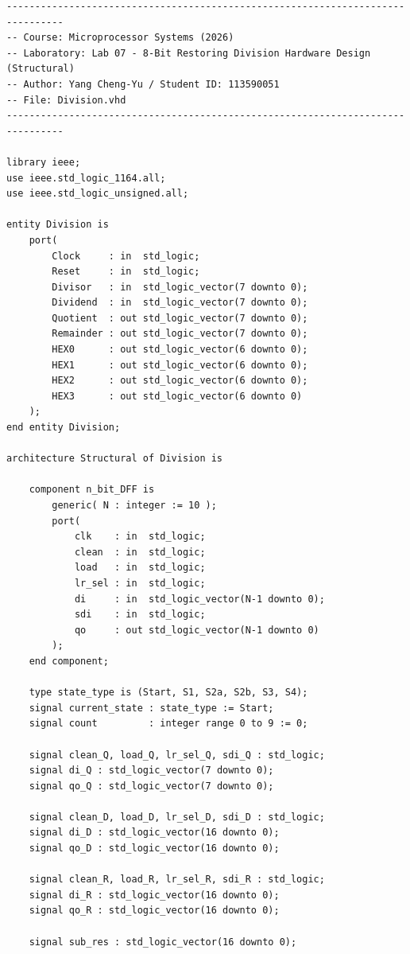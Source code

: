 \documentclass[12pt, a4paper]{article}
\begin{document}
\begin{lstlisting}[style=vhdlstyle, caption={Division.vhd --- 8-bit 恢復除法器頂層模組（結構化架構）}]
--------------------------------------------------------------------------------
-- Course: Microprocessor Systems (2026)
-- Laboratory: Lab 07 - 8-Bit Restoring Division Hardware Design (Structural)
-- Author: Yang Cheng-Yu / Student ID: 113590051
-- File: Division.vhd
--------------------------------------------------------------------------------

library ieee;
use ieee.std_logic_1164.all;
use ieee.std_logic_unsigned.all;

entity Division is
    port(
        Clock     : in  std_logic;
        Reset     : in  std_logic;
        Divisor   : in  std_logic_vector(7 downto 0);
        Dividend  : in  std_logic_vector(7 downto 0);
        Quotient  : out std_logic_vector(7 downto 0);
        Remainder : out std_logic_vector(7 downto 0);
        HEX0      : out std_logic_vector(6 downto 0);
        HEX1      : out std_logic_vector(6 downto 0);
        HEX2      : out std_logic_vector(6 downto 0);
        HEX3      : out std_logic_vector(6 downto 0)
    );
end entity Division;

architecture Structural of Division is

    component n_bit_DFF is
        generic( N : integer := 10 );
        port(
            clk    : in  std_logic;
            clean  : in  std_logic;
            load   : in  std_logic;
            lr_sel : in  std_logic;
            di     : in  std_logic_vector(N-1 downto 0);
            sdi    : in  std_logic;
            qo     : out std_logic_vector(N-1 downto 0)
        );
    end component;

    type state_type is (Start, S1, S2a, S2b, S3, S4);
    signal current_state : state_type := Start;
    signal count         : integer range 0 to 9 := 0;

    signal clean_Q, load_Q, lr_sel_Q, sdi_Q : std_logic;
    signal di_Q : std_logic_vector(7 downto 0);
    signal qo_Q : std_logic_vector(7 downto 0);

    signal clean_D, load_D, lr_sel_D, sdi_D : std_logic;
    signal di_D : std_logic_vector(16 downto 0);
    signal qo_D : std_logic_vector(16 downto 0);

    signal clean_R, load_R, lr_sel_R, sdi_R : std_logic;
    signal di_R : std_logic_vector(16 downto 0);
    signal qo_R : std_logic_vector(16 downto 0);

    signal sub_res : std_logic_vector(16 downto 0);


\end{lstlisting}
\end{document}
